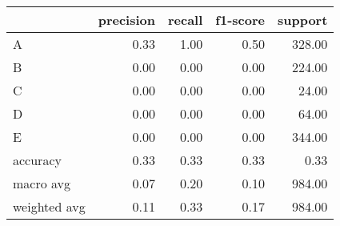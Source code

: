 \begin{tabular}{|l|r|r|r|r|}
\hline
{} &  precision &  recall &  f1-score &  support \\
\hline
A            &       0.33 &    1.00 &      0.50 &   328.00 \\
B            &       0.00 &    0.00 &      0.00 &   224.00 \\
C            &       0.00 &    0.00 &      0.00 &    24.00 \\
D            &       0.00 &    0.00 &      0.00 &    64.00 \\
E            &       0.00 &    0.00 &      0.00 &   344.00 \\
accuracy     &       0.33 &    0.33 &      0.33 &     0.33 \\
macro avg    &       0.07 &    0.20 &      0.10 &   984.00 \\
weighted avg &       0.11 &    0.33 &      0.17 &   984.00 \\
\hline
\end{tabular}
